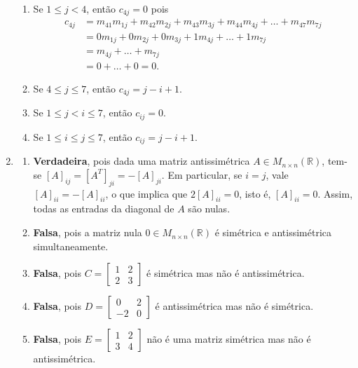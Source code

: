 \documentclass[12pt,a4paper]{article}
\newcommand*\R{\mathbb{R}}
\begin{document}
\begin{enumerate}
\begin{enumerate}
\item
Se $1 \leq j < 4$, então
$c_{4j} = 0$ pois
\begin{align*}
c_{4j} & = m_{41}m_{1j} + m_{42}m_{2j} + m_{43}m_{3j} + m_{44}m_{4j} + \ldots + m_{47}m_{7j} \\
       & = 0 m_{1j} + 0 m_{2j} + 0 m_{3j} + 1 m_{4j} + \ldots + 1m_{7j} \\
       & = m_{4j} + \ldots + m_{7j} \\
       & = 0 + \ldots + 0 = 0.
\end{align*}

\item
Se $4 \leq j \leq 7$, então $c_{4j} = j - i + 1$.
\item
Se $1 \leq j < i \leq 7$, então $c_{ij} = 0$.
\item
Se $1 \leq i \leq j \leq 7$, então $c_{ij} = j - i + 1$.
\end{enumerate}

\item \begin{enumerate}
\item
\textbf{Verdadeira}, pois dada uma matriz antissimétrica $A \in M_{n \times n}(\R)$, tem-se $[A]_{ij} = [A^T]_{ji} = -[A]_{ji}$. Em particular, se $i = j$, vale $[A]_{ii} = -[A]_{ii}$, o que implica que  $2[A]_{ii} = 0$, isto é,  $[A]_{ii} = 0$. Assim, todas as entradas da diagonal de $A$ são nulas.
\item
\textbf{Falsa}, pois a matriz nula $0 \in M_{n \times n}(\R)$ é simétrica e antissimétrica simultaneamente.
\item
\textbf{Falsa}, pois $C = \begin{bmatrix}
1 & 2 \\ 2 & 3
\end{bmatrix}$ é simétrica mas não é antissimétrica.
\item
\textbf{Falsa}, pois $D = \begin{bmatrix}
0 & 2 \\ -2 & 0
\end{bmatrix}$ é antissimétrica mas não é simétrica.
\item
\textbf{Falsa}, pois $E = \begin{bmatrix}
1 & 2 \\ 3 & 4
\end{bmatrix}$ não é uma matriz simétrica mas não é antissimétrica.
\end{enumerate}


\end{enumerate}
\end{document}
